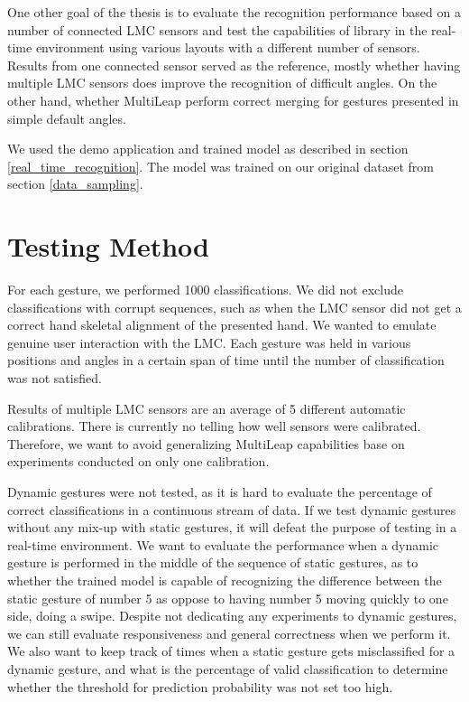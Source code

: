 
One other goal of the thesis is to evaluate the recognition performance based on a number of connected LMC sensors and test the capabilities of  library in the real-time environment using various layouts with a different number of sensors. Results from one connected sensor served as the reference, mostly whether having multiple LMC sensors does improve the recognition of difficult angles. On the other hand, whether MultiLeap \cite{tomasMultileap} perform correct merging for gestures presented in simple default angles.

We used the demo application and trained model as described in section \ref{real_time_recognition}. The model was trained on our original dataset from section \ref{data_sampling}. 

\section{Testing Method}

For each gesture, we performed 1000 classifications. We did not exclude classifications with corrupt sequences, such as when the LMC sensor did not get a correct hand skeletal alignment of the presented hand. We wanted to emulate genuine user interaction with the LMC. Each gesture was held in various positions and angles in a certain span of time until the number of classification was not satisfied. 

Results of multiple LMC sensors are an average of 5 different automatic calibrations. There is currently no telling how well sensors were calibrated. Therefore, we want to avoid generalizing MultiLeap capabilities base on experiments conducted on only one calibration.

Dynamic gestures were not tested, as it is hard to evaluate the percentage of correct classifications in a continuous stream of data. If we test dynamic gestures without any mix-up with static gestures, it will defeat the purpose of testing in a real-time environment. We want to evaluate the performance when a dynamic gesture is performed in the middle of the sequence of static gestures, as to whether the trained model is capable of recognizing the difference between the static gesture of number 5 as oppose to having number 5 moving quickly to one side, doing a swipe. Despite not dedicating any experiments to dynamic gestures, we can still evaluate responsiveness and general correctness when we perform it. We also want to keep track of times when a static gesture gets misclassified for a dynamic gesture, and what is the percentage of valid classification to determine whether the threshold for prediction probability was not set too high.


